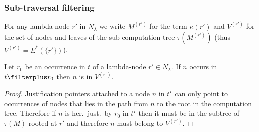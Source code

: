 %


\subsubsection{Sub-traversal filtering}

For any lambda node $r'$ in $N_\lambda$ we write
$M^{(r')}$ for the term $\kappa(r')$ and $V^{(r')}$ for the set of nodes and leaves of the sub computation tree $\tau(M^{(r')})$ (thus $V^{(r')} = E^*(\{r'\})$).

\begin{lemma}
\label{lem:instarfilter_imp_insubtree} Let $r_0$ be an occurrence in
$t$ of a lambda-node $r' \in N_\lambda$. If $n$ occurs in $t
\filterplus r_0$ then $n$ is in $V^{(r')}$.
\end{lemma}
\begin{proof}
Justification pointers attached to a node $n$ in $t^\star$ can only point to
 occurrences of nodes that lies in the path from $n$ to the root
 in the computation tree. Therefore if $n$ is her.\
 just.\ by $r_0$ in $t^\star$ then it must be in the subtree of $\tau(M)$ rooted
 at $r'$ and  therefore $n$ must belong to $V^{(r')}$.
\end{proof}


